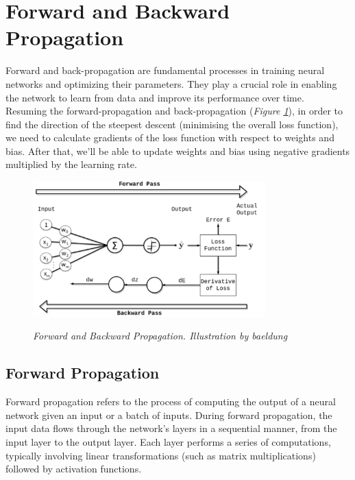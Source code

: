 \newpage

\section{Forward and Backward Propagation}

Forward and back-propagation are fundamental processes in training neural
networks and optimizing their parameters. They play a crucial role in enabling
the network to learn from data and improve its performance over time. \\

Resuming the forward-propagation and back-propagation (\textit{Figure
\ref{fig:forward-and-back-propagation}}), in order to find the direction of the
steepest descent (minimising the overall loss function), we need to calculate
gradients of the loss function with respect to weights and bias. After that,
we’ll be able to update weights and bias using negative gradients multiplied by
the learning rate.

\begin{figure}[H]
  \centering
  \includegraphics[width=0.8\textwidth]{imatges/preliminaries/front-and-back-prop.png}
  \caption[Forward and Backward Propagation]{\textit{Forward and Backward Propagation. Illustration by baeldung}}
  {\label{fig:forward-and-back-propagation}}
\end{figure}


\subsection{Forward Propagation}

Forward propagation refers to the process of computing the output of a neural
network given an input or a batch of inputs. During forward propagation, the
input data flows through the network's layers in a sequential manner, from the
input layer to the output layer. Each layer performs a series of computations,
typically involving linear transformations (such as matrix multiplications)
followed by activation functions. \\

